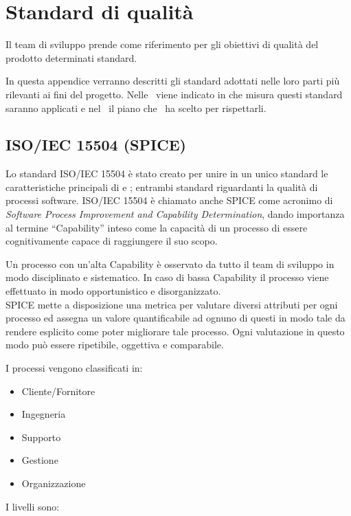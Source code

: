 \newpage
\section{Standard di qualità}	\label{StandardQualita}
Il team di sviluppo prende come riferimento per gli obiettivi di qualità del prodotto determinati standard.

In questa appendice verranno descritti gli standard adottati nelle loro parti più rilevanti ai fini del progetto. Nelle \NdPd\ viene indicato in che misura questi standard saranno applicati e nel \PdQd\ il piano che \gruppo\ ha scelto per rispettarli.

	\subsection{ISO/IEC 15504 (SPICE)}\label{iso15504}
	Lo standard ISO/IEC 15504 è stato creato per unire in un unico standard le caratteristiche principali di  e ; entrambi standard riguardanti la qualità di processi software.
	ISO/IEC 15504 è chiamato anche SPICE come acronimo di \textit{Software Process Improvement and Capability Determination}, dando importanza al termine ``Capability'' inteso come la capacità di un processo di essere cognitivamente capace di raggiungere il suo scopo. 
	
	Un processo con un'alta Capability è osservato da tutto il team di sviluppo in modo disciplinato e sistematico.
	In caso di bassa Capability il processo viene effettuato in modo opportunistico e disorganizzato.\\
	
	SPICE mette a disposizione una metrica per valutare diversi attributi per ogni processo ed assegna un valore quantificabile ad ognuno di questi in modo tale da rendere esplicito come poter migliorare tale processo. Ogni valutazione in questo modo può essere ripetibile, oggettiva e comparabile.
	
	I processi vengono classificati in:

	

	\begin{itemize}
		\item Cliente/Fornitore
		\item Ingegneria
		\item Supporto
		\item Gestione
		\item Organizzazione
	\end{itemize}
	
	I livelli sono:
	
